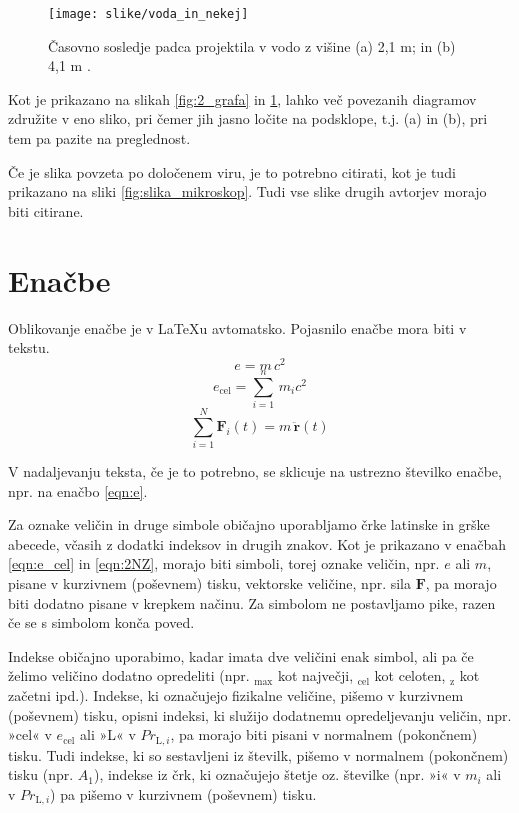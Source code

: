 \begin{figure}[ht!]
	\begin{centering}
		\texttt{[image: slike/voda\_in\_nekej]}
		\caption{Časovno sosledje padca projektila v vodo z višine (a) 2,1 m; 
		in (b) 
			4,1 m \cite{Loukides_2020}.} \label{fig:voda_in_nekej}
	\end{centering}
\end{figure}

Kot je prikazano na slikah \ref{fig:2_grafa} in \ref{fig:voda_in_nekej}, lahko 
več povezanih diagramov združite v eno sliko, pri čemer jih jasno ločite na 
podsklope, t.j. (a) in (b), pri tem pa pazite na preglednost.

Če je slika povzeta po določenem viru, je to potrebno citirati, kot je tudi 
prikazano na sliki \ref{fig:slika_mikroskop}. Tudi vse slike drugih avtorjev 
morajo biti citirane.

\section{Enačbe}\label{sec:enacbe}

Oblikovanje enačbe je v \LaTeX u avtomatsko. Pojasnilo enačbe mora biti v 
tekstu.
\begin{equation}\label{eqn:e}
	e = m\,c^2
\end{equation}
\begin{equation}\label{eqn:e_cel}
	e_{\text{cel}}=\sum_{i=1}^{n}\,m_{i}c^2
\end{equation}
\begin{equation}\label{eqn:2NZ}
	\sum_{i=1}^{N}\bm{F}_i(t)=m\,\ddot{\bm{r}}(t)
\end{equation}

V nadaljevanju teksta, če je to potrebno, se sklicuje na ustrezno številko 
enačbe, npr. na enačbo \eqref{eqn:e}.

Za oznake veličin in druge simbole običajno uporabljamo črke latinske in grške 
abecede, včasih z dodatki indeksov in drugih znakov. Kot je prikazano v enačbah 
\eqref{eqn:e_cel} in \eqref{eqn:2NZ}, morajo biti simboli, torej oznake veličin, 
npr. $e$ ali $m$, pisane v kurzivnem (poševnem) tisku, vektorske veličine, npr. sila $\bm{F}$, pa morajo biti dodatno pisane v krepkem načinu. Za simbolom ne postavljamo pike, razen če se s simbolom konča poved.

Indekse običajno uporabimo, kadar imata dve veličini enak simbol, ali pa če 
želimo veličino dodatno opredeliti (npr. $_{\text{max}}$ kot največji, 
$_{\text{cel}}$ kot celoten, $_{\text{z}}$ kot začetni ipd.). Indekse, ki 
označujejo fizikalne veličine, pišemo v kurzivnem (poševnem) tisku, opisni 
indeksi, ki služijo dodatnemu opredeljevanju veličin, npr. »cel« v 
$e_{\text{cel}}$ ali »L« v $Pr_{\text{L},i}$, pa morajo biti pisani v normalnem 
(pokončnem) tisku. Tudi indekse, ki so sestavljeni iz številk, pišemo v 
normalnem (pokončnem) tisku (npr. $A_1$), indekse iz črk, ki označujejo štetje 
oz. številke (npr. »i« v $m_i$ ali v $Pr_{\text{L},i}$) pa pišemo v kurzivnem 
(poševnem) tisku.

